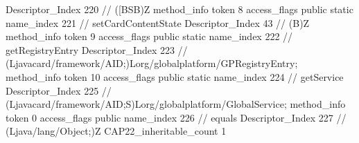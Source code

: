 {{{{{					Descriptor_Index	220		// ([BSB)Z
				}
				method_info {
					token	8
					access_flags	public static
					name_index	221		// setCardContentState
					Descriptor_Index	43		// (B)Z
				}
				method_info {
					token	9
					access_flags	public static
					name_index	222		// getRegistryEntry
					Descriptor_Index	223		// (Ljavacard/framework/AID;)Lorg/globalplatform/GPRegistryEntry;
				}
				method_info {
					token	10
					access_flags	public static
					name_index	224		// getService
					Descriptor_Index	225		// (Ljavacard/framework/AID;S)Lorg/globalplatform/GlobalService;
				}
				method_info {
					token	0
					access_flags	public
					name_index	226		// equals
					Descriptor_Index	227		// (Ljava/lang/Object;)Z
				}
			}
			CAP22_inheritable_count	1
		}
	}
}
